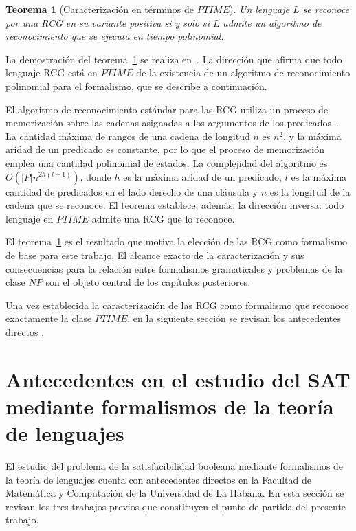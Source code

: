 \documentclass{report}
\theoremstyle{definition}
\theoremstyle{plain}
\newtheorem{teorema}{Teorema}[chapter]
\theoremstyle{remark}
\begin{document}
\begin{teorema}[Caracterización en términos de $PTIME$]
\label{teo:prcg-ptime}
Un lenguaje $L$ se reconoce por una RCG en su variante positiva si y
solo si $L$ admite un algoritmo de reconocimiento que se ejecuta en
tiempo polinomial.
\end{teorema}

La demostración del teorema~\ref{teo:prcg-ptime} se realiza
en~\cite{bertsch2001rcg, boullier2000range}. La dirección que afirma
que todo lenguaje RCG está en $PTIME$  de la existencia de un
algoritmo de reconocimiento polinomial para el formalismo, que se
describe a continuación.

El algoritmo de reconocimiento estándar para las RCG utiliza un proceso
de memorización sobre las cadenas asignadas a los argumentos de los
predicados~\cite{boullier1998proposal}. La cantidad máxima de rangos de
una cadena de longitud $n$ es $n^2$, y la máxima aridad de un predicado
es constante, por lo que el proceso de memorización emplea una cantidad
polinomial de estados. La complejidad del algoritmo es $O(|P|
n^{2h(l+1)})$, donde $h$ es la máxima aridad de un predicado, $l$ es
la máxima cantidad de predicados en el lado derecho de una cláusula y
$n$ es la longitud de la cadena que se reconoce. El teorema establece,
además, la dirección inversa: todo lenguaje en $PTIME$ admite una RCG
que lo reconoce.

El teorema~\ref{teo:prcg-ptime} es el resultado que motiva la elección
de las RCG como formalismo de base para este trabajo. El alcance exacto
de la caracterización y sus consecuencias para la relación entre
formalismos gramaticales y problemas de la clase $NP$ son el objeto
central de los capítulos posteriores.

Una vez establecida la caracterización de las RCG como formalismo que
reconoce exactamente la clase $PTIME$, en la siguiente sección se
revisan los antecedentes directos .

\section{Antecedentes en el estudio del SAT mediante formalismos de la teoría de lenguajes}
\label{sec:antecedentes}

El estudio del problema de la satisfacibilidad booleana mediante
formalismos de la teoría de lenguajes cuenta con antecedentes directos
en la Facultad de Matemática y Computación de la Universidad de La
Habana. En esta sección se revisan los tres trabajos previos que
constituyen el punto de partida del presente trabajo.
\end{document}
